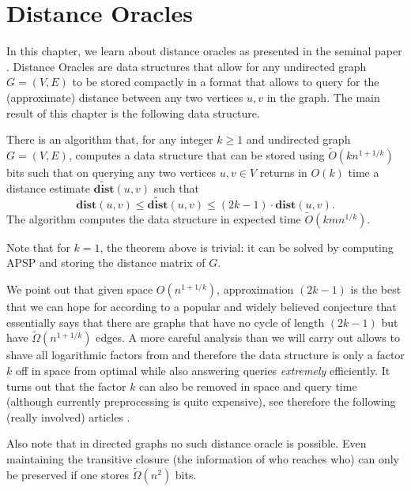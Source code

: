 \chapter{Distance Oracles}

In this chapter, we learn about distance oracles as presented in the seminal paper \cite{thorup2005approximate}. Distance Oracles are data structures that allow for any undirected graph $G =(V,E)$ to be stored compactly in a format that allows to query for the (approximate) distance between any two vertices $u,v$ in the graph. The main result of this chapter is the following data structure.

\begin{theorem}\label{thm:mainDistanceOracle}
There is an algorithm that, for any integer $k \geq 1$ and undirected graph $G=(V,E)$, computes a data structure that can be stored using $\tilde{O}(kn^{1+1/k})$ bits such that on querying any two vertices $u,v \in V$ returns in $O(k)$ time a distance estimate $\widetilde{\mathbf{dist}}(u,v)$ such that
\[
\mathbf{dist}(u,v) \leq \widetilde{\mathbf{dist}}(u,v) \leq (2k-1) \cdot \mathbf{dist}(u,v).
\]
The algorithm computes the data structure in expected time $\tilde{O}(kmn^{1/k})$.
\end{theorem}

\begin{remark}Note that for $k=1$, the theorem above is trivial: it can be solved by computing APSP and storing the distance matrix of $G$.
\end{remark}

\begin{remark}
We point out that given space $O(n^{1+1/k})$, approximation $(2k-1)$ is the best that we can hope for according to a popular and widely believed conjecture that essentially says that there are graphs that have no cycle of length $(2k-1)$ but have $\tilde{\Omega}(n^{1+1/k})$ edges. A more careful analysis than we will carry out allows to shave all logarithmic factors from  and therefore the data structure is only a factor $k$ off in space from optimal while also answering queries \emph{extremely} efficiently. It turns out that the factor $k$ can also be removed in space and query time (although currently preprocessing is quite expensive), see therefore the following (really involved) articles \cite{chechik2014approximate, chechik2015approximate}.
\end{remark}

\begin{remark}
Also note that in directed graphs no such distance oracle is possible. Even maintaining the transitive closure (the information of who reaches who) can only be preserved if one stores $\tilde{\Omega}(n^2)$ bits.
\end{remark}

